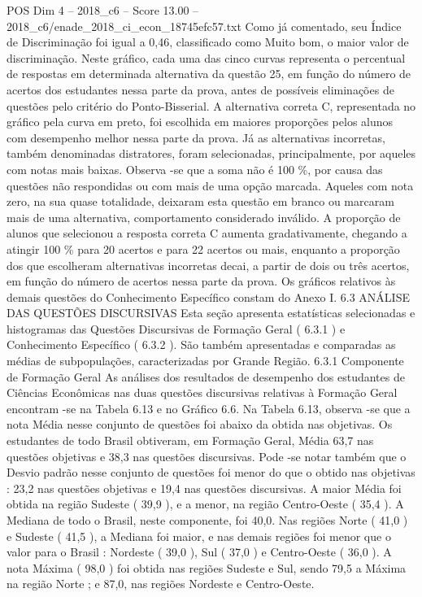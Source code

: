\begin{textsample}{POS Dim 4 – 2018\_c6 – Score 13.00 – 2018\_c6/enade\_2018\_ci\_econ\_18745efc57.txt}
Como já comentado, seu Índice de Discriminação foi igual a 0,46, classificado como Muito bom, o maior valor de discriminação.
Neste gráfico, cada uma das cinco curvas representa o percentual de respostas em determinada alternativa da questão 25, em função do número de acertos dos estudantes nessa parte da prova, antes de possíveis eliminações de questões pelo critério do Ponto-Bisserial.
A alternativa correta C, representada no gráfico pela curva em preto, foi escolhida em maiores proporções pelos alunos com desempenho melhor nessa parte da prova.
Já as alternativas incorretas, também denominadas distratores, foram selecionadas, principalmente, por aqueles com notas mais baixas.
Observa -se que a soma não é 100 \%, por causa das questões não respondidas ou com mais de uma opção marcada.
Aqueles com nota zero, na sua quase totalidade, deixaram esta questão em branco ou marcaram mais de uma alternativa, comportamento considerado inválido.
A proporção de alunos que selecionou a resposta correta C aumenta gradativamente, chegando a atingir 100 \% para 20 acertos e para 22 acertos ou mais, enquanto a proporção dos que escolheram alternativas incorretas decai, a partir de dois ou três acertos, em função do número de acertos nessa parte da prova.
Os gráficos relativos às demais questões do Conhecimento Específico constam do Anexo I. 6.3 ANÁLISE DAS QUESTÕES DISCURSIVAS Esta seção apresenta estatísticas selecionadas e histogramas das Questões Discursivas de Formação Geral ( 6.3.1 ) e Conhecimento Específico ( 6.3.2 ).
São também apresentadas e comparadas as médias de subpopulações, caracterizadas por Grande Região. 6.3.1 Componente de Formação Geral As análises dos resultados de desempenho dos estudantes de Ciências Econômicas nas duas questões discursivas relativas à Formação Geral encontram -se na Tabela 6.13 e no Gráfico 6.6.
Na Tabela 6.13, observa -se que a nota Média nesse conjunto de questões foi abaixo da obtida nas objetivas.
Os estudantes de todo Brasil obtiveram, em Formação Geral, Média 63,7 nas questões objetivas e 38,3 nas questões discursivas.
Pode -se notar também que o Desvio padrão nesse conjunto de questões foi menor do que o obtido nas objetivas : 23,2 nas questões objetivas e 19,4 nas questões discursivas.
A maior Média foi obtida na região Sudeste ( 39,9 ), e a menor, na região Centro-Oeste ( 35,4 ).
A Mediana de todo o Brasil, neste componente, foi 40,0.
Nas regiões Norte ( 41,0 ) e Sudeste ( 41,5 ), a Mediana foi maior, e nas demais regiões foi menor que o valor para o Brasil : Nordeste ( 39,0 ), Sul ( 37,0 ) e Centro-Oeste ( 36,0 ).
A nota Máxima ( 98,0 ) foi obtida nas regiões Sudeste e Sul, sendo 79,5 a Máxima na região Norte ; e 87,0, nas regiões Nordeste e Centro-Oeste.

\end{textsample}
